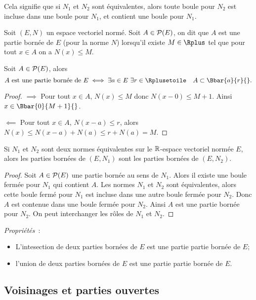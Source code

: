 Cela signifie que si $N_1$ et $N_2$ sont équivalentes, alors toute boule pour $N_2$ est incluse dans une boule pour $N_1$, et contient une boule pour $N_1$.

\begin{defdef}
  Soit $(E, N)$ un espace vectoriel normé. Soit $A \in \P(E)$, on dit que $A$ est une partie bornée de $E$ (pour la norme $N$) lorsqu'il existe $M \in \Rplus$ tel que pour tout $x \in A$ on a $N(x) \leq M$.
\end{defdef}
\begin{defdef}
  Soit $A \in \P(E)$, alors
  \begin{equation}
    A \text{~est une partie bornée de~} E \iff \exists a \in E \ \exists r \in \Rplusetoile \quad A \subset \Bbar{a}{r}{}.
  \end{equation}
\end{defdef}
\begin{proof}
  $\implies$ Pour tout $x \in A$, $N(x) \leq M$ donc $N(x-0) \leq M+1$. Ainsi $x \in \Bbar{0}{M+1}{}$.

  $\impliedby$ Pour tout $x \in A$, $N(x-a) \leq r$, alors $N(x) \leq N(x-a)+N(a) \leq r+N(a)=M$.
\end{proof}
\begin{prop}
  Si $N_1$ et $N_2$ sont deux normes équivalentes sur le $\R$-espace vectoriel normée $E$, alors les parties bornées de $(E, N_1)$ sont les parties bornées de $(E, N_2)$.
\end{prop}
\begin{proof}
  Soit $A \in \P(E)$ une partie bornée au sens de $N_1$. Alors il existe une boule fermée pour $N_1$ qui contient $A$. Les normes $N_1$ et $N_2$ sont équivalentes, alors cette boule fermé pour $N_1$ est incluse dans une autre boule fermée pour $N_2$. Donc $A$ est contenue dans une boule fermée pour $N_2$. Ainsi $A$ est une partie bornée pour $N_2$. On peut interchanger les rôles de $N_1$ et $N_2$.
\end{proof}

\emph{Propriétés}~:
\begin{itemize}
\item L'intesection de deux parties bornées de $E$ est une partie partie bornée de $E$;
\item l'union de deux parties bornées de $E$ est une partie partie bornée de $E$.
\end{itemize}

\subsection{Voisinages et parties ouvertes}


